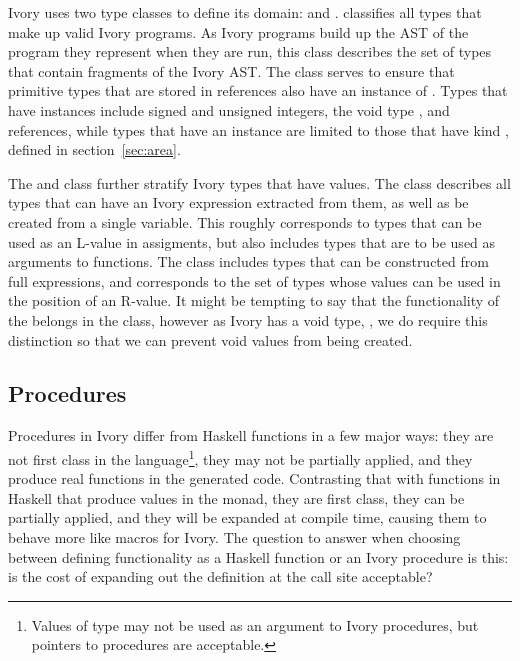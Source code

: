Ivory uses two type classes to define its domain:  and
.   classifies all types that make up valid Ivory
programs.  As Ivory programs build up the AST of the program they represent when
they are run, this class describes the set of types that contain fragments of
the Ivory AST.  The  class serves to ensure that primitive types
that are stored in references also have an instance of .  Types
that have  instances include signed and unsigned integers, the
void type \cd{()}, and references, while types that have an 
instance are limited to those that have kind , defined in
section~\ref{sec:area}.

The  and  class further stratify Ivory types that
have values.  The  class describes all types that can have an Ivory
expression extracted from them, as well as be created from a single variable.
This roughly corresponds to types that can be used as an L-value in assigments,
but also includes types that are to be used as arguments to functions.
The  class includes types that can be constructed from full
expressions, and corresponds to the set of types whose values can be used in the
position of an R-value.  It might be tempting to say that the functionality of
the  belongs in the  class, however as Ivory has a
void type, \cd{()}, we do require this distinction so that we can prevent void
values from being created.

\subsection{Procedures}
\label{sec:proc}

Procedures in Ivory differ from Haskell functions in a few major ways: they are
not first class in the language\footnote{Values of type  may not be used
as an argument to Ivory procedures, but pointers to procedures are acceptable.},
they may not be partially applied, and they produce real functions in the
generated code.  Contrasting that with functions in Haskell that produce values
in the  monad, they are first class, they can be partially applied,
and they will be expanded at compile time, causing them to behave more like
macros for Ivory.  The question to answer when choosing between defining
functionality as a Haskell function or an Ivory procedure is this: is the cost
of expanding out the definition at the call site acceptable?

